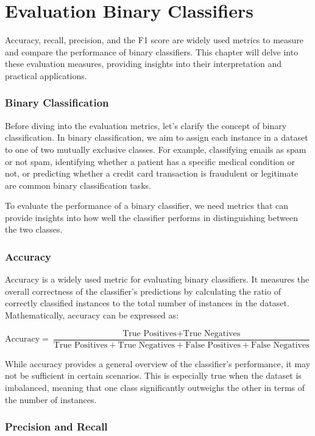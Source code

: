 \chapter{Evaluation Binary Classifiers}

Accuracy, recall, precision, and the F1 score are widely used metrics to measure and compare the performance of binary classifiers. This chapter will delve into these evaluation measures, providing insights into their interpretation and practical applications.

\subsection{Binary Classification}

Before diving into the evaluation metrics, let's clarify the concept of binary classification. In binary classification, we aim to assign each instance in a dataset to one of two mutually exclusive classes. For example, classifying emails as spam or not spam, identifying whether a patient has a specific medical condition or not, or predicting whether a credit card transaction is fraudulent or legitimate are common binary classification tasks.

To evaluate the performance of a binary classifier, we need metrics that can provide insights into how well the classifier performs in distinguishing between the two classes.

\subsection{Accuracy}

Accuracy is a widely used metric for evaluating binary classifiers. It measures the overall correctness of the classifier's predictions by calculating the ratio of correctly classified instances to the total number of instances in the dataset. Mathematically, accuracy can be expressed as:

$$ \text{Accuracy} = \frac{\text{True Positives} + \text{True Negatives}} {
\text{True Positives} + \text{True Negatives} + \text{False Positives}+ \text{False Negatives}} $$
 

While accuracy provides a general overview of the classifier's performance, it may not be sufficient in certain scenarios. This is especially true when the dataset is imbalanced, meaning that one class significantly outweighs the other in terms of the number of instances.

\subsection{Precision and Recall}

